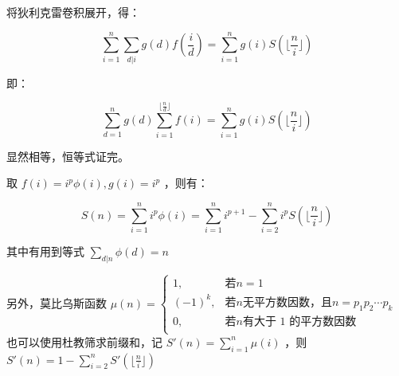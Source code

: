 \documentclass{article}
\begin{document}
将狄利克雷卷积展开，得：

$$\sum\limits_{i = 1}^{n} \sum\limits_{d | i} g(d) f(\frac{i}{d}) = \sum\limits_{i = 1}^{n} g(i) S(\lfloor \frac{n}{i} \rfloor)$$

即：

$$\sum\limits_{d = 1}^{n} g(d) \sum\limits_{i = 1}^{\lfloor \frac{n}{d} \rfloor} f(i) = \sum\limits_{i = 1}^{n} g(i) S(\lfloor \frac{n}{i} \rfloor)$$

显然相等，恒等式证完。

取 $f(i) = i^p \phi(i), g(i) = i^p$ ，则有：

$$S(n) = \sum\limits_{i = 1}^{n} i^p \phi(i) = \sum\limits_{i = 1}^{n} i^{p+1} - \sum\limits_{i = 2}^{n}i^pS(\lfloor \frac{n}{i} \rfloor)$$

其中有用到等式 $\sum\limits_{d | n} \phi(d) = n$

另外，莫比乌斯函数
$\mu (n) = \left\{
	\begin{array}{lr}
	1, & \text{若} n = 1 \\
	(-1)^k, & \text{若} n \text{无平方数因数，且} n = p_1p_2 \cdots p_k \\
	0, & \text{若} n \text{有大于 1 的平方数因数} \\
	\end{array}
\right.
$ 也可以使用杜教筛求前缀和，记 $S'(n) = \sum\limits_{i = 1}^{n} \mu (i)$ ，则 $S'(n) = 1 - \sum\limits_{i = 2}^{n} S'(\lfloor \frac{n}{i} \rfloor)$
\end{document}
